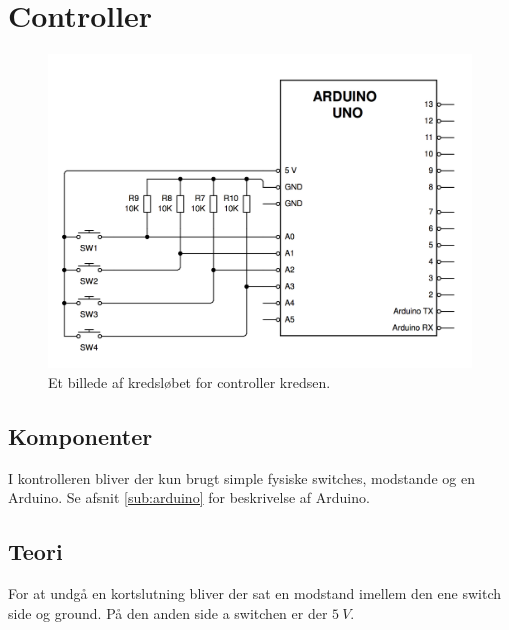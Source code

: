 \section{Controller}
\begin{figure}[H]	
	\centering
    \includegraphics[width=13cm]{figures/CIRCUITS/controllerFinal.png}
	\caption{Et billede af kredsløbet for controller kredsen.}
	\label{kreds:controller}
\end{figure}

\subsection{Komponenter}
I kontrolleren bliver der kun brugt simple fysiske switches, modstande og en Arduino. Se afsnit \ref{sub:arduino} for beskrivelse af Arduino.


\subsection{Teori}
For at undgå en kortslutning bliver der sat en modstand imellem den ene switch side og ground. På den anden side a switchen er der $\SI{5}{V}$.

